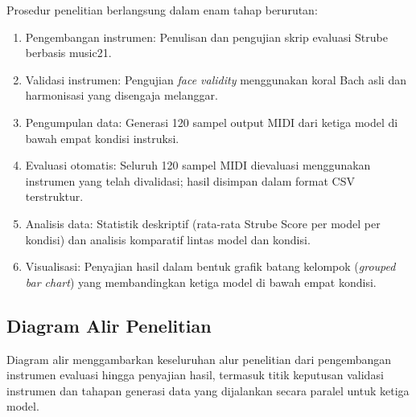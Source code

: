 Prosedur penelitian berlangsung dalam enam tahap berurutan:

\begin{enumerate}
    \item Pengembangan instrumen: Penulisan dan pengujian skrip evaluasi Strube berbasis music21.
    \item Validasi instrumen: Pengujian \textit{face validity} menggunakan koral Bach asli dan harmonisasi yang disengaja melanggar.
    \item Pengumpulan data: Generasi 120 sampel output MIDI dari ketiga model di bawah empat kondisi instruksi.
    \item Evaluasi otomatis: Seluruh 120 sampel MIDI dievaluasi menggunakan instrumen yang telah divalidasi; hasil disimpan dalam format CSV terstruktur.
    \item Analisis data: Statistik deskriptif (rata-rata Strube Score per model per kondisi) dan analisis komparatif lintas model dan kondisi.
    \item Visualisasi: Penyajian hasil dalam bentuk grafik batang kelompok (\textit{grouped bar chart}) yang membandingkan ketiga model di bawah empat kondisi.
\end{enumerate}

\subsection{Diagram Alir Penelitian}

Diagram alir menggambarkan keseluruhan alur penelitian dari pengembangan instrumen evaluasi hingga penyajian hasil, termasuk titik keputusan validasi instrumen dan tahapan generasi data yang dijalankan secara paralel untuk ketiga model.

